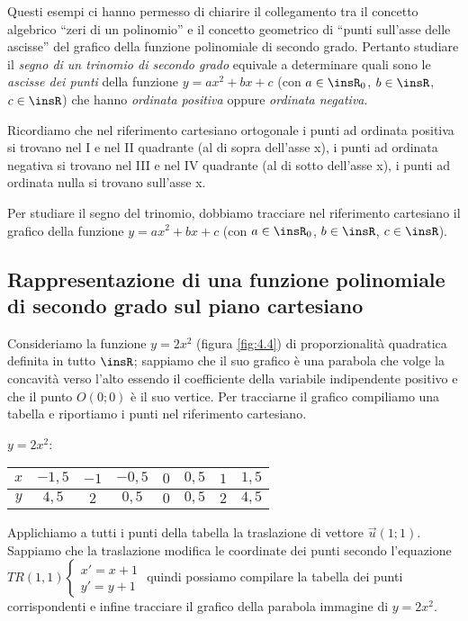 Questi esempi ci hanno permesso di chiarire il collegamento tra il concetto algebrico “zeri di un polinomio” e il concetto geometrico di “punti sull’asse delle ascisse” del grafico della funzione polinomiale di secondo grado. Pertanto studiare il \emph{segno di un trinomio di secondo grado} equivale a determinare quali sono le \emph{ascisse dei punti} della funzione $y=ax^2+bx+c$ (con $a\in \insR_{0}$, $b\in \insR$, $c\in \insR$) che hanno \emph{ordinata positiva} oppure \emph{ ordinata negativa}.

Ricordiamo che nel riferimento cartesiano ortogonale i punti ad ordinata positiva si trovano nel I e nel II quadrante (al di sopra dell’asse x), i punti ad ordinata negativa si trovano nel III e nel IV quadrante (al di sotto dell’asse x), i punti ad ordinata nulla si trovano sull’asse x.

Per studiare il segno del trinomio, dobbiamo tracciare nel riferimento cartesiano il grafico della funzione $y=ax^2+bx+c$ (con $a\in \insR_{0}$, $b\in \insR$, $c\in \insR$).

\subsection{Rappresentazione di una funzione polinomiale di secondo grado sul piano cartesiano}
Consideriamo la funzione $y=2x^2$ (figura \ref{fig:4.4}) di proporzionalità quadratica definita in tutto $\insR$; sappiamo che il suo grafico è una parabola che volge la concavità verso l’alto essendo il coefficiente della variabile indipendente positivo e che il punto $O(0;0)$ è il suo vertice. Per tracciarne il grafico compiliamo una tabella e riportiamo i punti nel riferimento cartesiano.

$y=2x^2$:\quad
\begin{tabular} {*{8}{c}}
$x$ & $-1,5$ & $-1$ & $-0,5$ & $0$ & $0,5$ & $1$ & $1,5$\\
\midrule
$y$ & $4,5$ & $2$ & $0,5$ & $0$ & $0,5$ & $2$ & $4,5$\\
\end{tabular}
Applichiamo a tutti i punti della tabella la traslazione di vettore $\vec u(1;1)$. Sappiamo che la traslazione modifica le coordinate dei punti secondo l’equazione ${TR}(1,1) \left\{\begin{array}{l}{x'=x+1}\\{y'=y+1}\end{array}\right.$ quindi possiamo compilare la tabella dei punti corrispondenti e infine tracciare il grafico della parabola immagine di $y=2x^2$.

